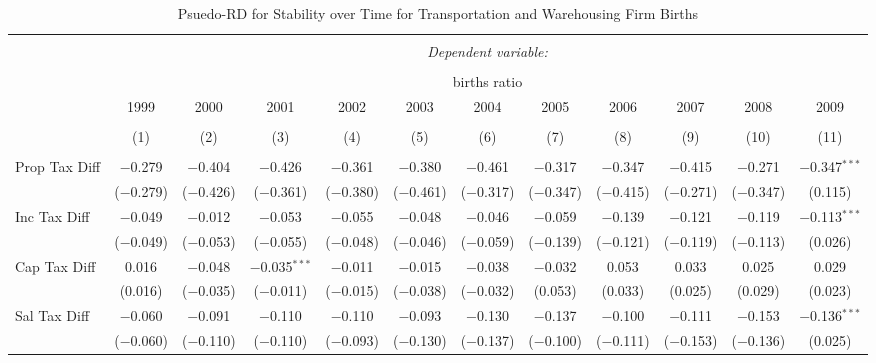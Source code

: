 
\begin{table}[!htbp] \centering 
  \caption{Psuedo-RD for Stability over Time for  Transportation and Warehousing Firm Births} 
  \label{48-49year} 
\small 
\begin{tabular}{@{\extracolsep{5pt}}lccccccccccc} 
\\[-1.8ex]\hline 
\hline \\[-1.8ex] 
 & \multicolumn{11}{c}{\textit{Dependent variable:}} \\ 
\cline{2-12} 
\\[-1.8ex] & \multicolumn{11}{c}{births ratio} \\ 
 & 1999 & 2000 & 2001 & 2002 & 2003 & 2004 & 2005 & 2006 & 2007 & 2008 & 2009 \\ 
\\[-1.8ex] & (1) & (2) & (3) & (4) & (5) & (6) & (7) & (8) & (9) & (10) & (11)\\ 
\hline \\[-1.8ex] 
 Prop Tax Diff & $-$0.279 & $-$0.404 & $-$0.426 & $-$0.361 & $-$0.380 & $-$0.461 & $-$0.317 & $-$0.347 & $-$0.415 & $-$0.271 & $-$0.347$^{***}$ \\ 
  & ($-$0.279) & ($-$0.426) & ($-$0.361) & ($-$0.380) & ($-$0.461) & ($-$0.317) & ($-$0.347) & ($-$0.415) & ($-$0.271) & ($-$0.347) & (0.115) \\ 
  Inc Tax Diff & $-$0.049 & $-$0.012 & $-$0.053 & $-$0.055 & $-$0.048 & $-$0.046 & $-$0.059 & $-$0.139 & $-$0.121 & $-$0.119 & $-$0.113$^{***}$ \\ 
  & ($-$0.049) & ($-$0.053) & ($-$0.055) & ($-$0.048) & ($-$0.046) & ($-$0.059) & ($-$0.139) & ($-$0.121) & ($-$0.119) & ($-$0.113) & (0.026) \\ 
  Cap Tax Diff & 0.016 & $-$0.048 & $-$0.035$^{***}$ & $-$0.011 & $-$0.015 & $-$0.038 & $-$0.032 & 0.053 & 0.033 & 0.025 & 0.029 \\ 
  & (0.016) & ($-$0.035) & ($-$0.011) & ($-$0.015) & ($-$0.038) & ($-$0.032) & (0.053) & (0.033) & (0.025) & (0.029) & (0.023) \\ 
  Sal Tax Diff & $-$0.060 & $-$0.091 & $-$0.110 & $-$0.110 & $-$0.093 & $-$0.130 & $-$0.137 & $-$0.100 & $-$0.111 & $-$0.153 & $-$0.136$^{***}$ \\ 
  & ($-$0.060) & ($-$0.110) & ($-$0.110) & ($-$0.093) & ($-$0.130) & ($-$0.137) & ($-$0.100) & ($-$0.111) & ($-$0.153) & ($-$0.136) & (0.025) \\ 

\end{tabular}
\end{table}
